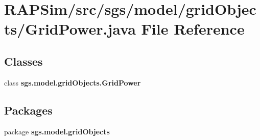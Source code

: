 \section{R\-A\-P\-Sim/src/sgs/model/grid\-Objects/\-Grid\-Power.java File Reference}
\label{_grid_power_8java}
\subsection*{Classes}
\begin{DoxyCompactItemize}
\item 
class {\bf sgs.\-model.\-grid\-Objects.\-Grid\-Power}
\end{DoxyCompactItemize}
\subsection*{Packages}
\begin{DoxyCompactItemize}
\item 
package {\bf sgs.\-model.\-grid\-Objects}
\end{DoxyCompactItemize}
